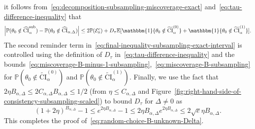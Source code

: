 \documentclass{article}
\numberwithin{myalgctr}{section}
\begin{document}
it follows from~\eqref{eq:decomposition-subsampling-miscoverage-exact} and~\eqref{eq:tau-difference-inequality} that
\begin{equation}\label{eq:final-inequality-subsampling-exact-interval}
\left|\mathbb{P}(\theta_0 \notin \widehat{\mathrm{CI}}_{\alpha}^{\mathrm{sub}}) - \mathbb{P}(\theta_0 \notin \widehat{\mathrm{CI}}_{\alpha,\Delta})\right| \le 2\mathbb{P}(\mathcal{E}_0^c) + D_{\tau}\mathbb{E}[\mathbbm{1}\{\theta_0\notin\widetilde{\mathrm{CI}}_{\alpha}^{(0)}\} + \mathbbm{1}\{\theta_0\notin\widetilde{\mathrm{CI}}_{\alpha}^{(1)}\}].
\end{equation} 
The second reminder term in~\eqref{eq:final-inequality-subsampling-exact-interval} is controlled using the definition of $D_{\tau}$ in~\eqref{eq:tau-difference-inequality} and the bounds~\eqref{eq:miscoverage-B-minus-1-subsampling},~\eqref{eq:miscoverage-B-subsampling} for $\mathbb{P}(\theta_0\notin\widetilde{\mathrm{CI}}_{\alpha}^{(0)})$ and $\mathbb{P}(\theta_0 \notin\widetilde{\mathrm{CI}}_{\alpha}^{(1)})$. Finally, we use the fact that $2\eta B_{\alpha,\Delta} \le 2C_{\alpha,\Delta}B_{\alpha,\Delta} \le 1/2$ (from $\eta \le C_{\alpha,\Delta}$ and Figure~\ref{fig:right-hand-side-of-consistency-subsampling-scaled}) to bound $D_{\tau}$ for $\Delta \neq 0$ as 
\[
(1 + 2\eta)^{B_{\alpha,\Delta}} - 1 \le e^{2\eta B_{\alpha,\Delta}} - 1 \le 2\eta B_{\alpha,\Delta}e^{2\eta B_{\alpha,\Delta}} \le 2\sqrt{e}\eta B_{\alpha,\Delta}.
\]
This completes the proof of~\eqref{eq:random-choice-B-unknown-Delta}. 
\end{document}
